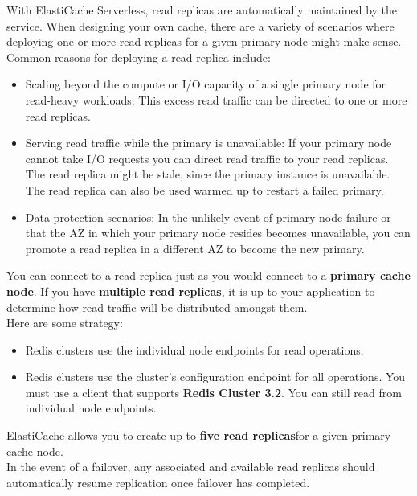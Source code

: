 \documentclass[12pt, letterpaper, twoside]{article}
\begin{document}
With ElastiCache Serverless, read replicas are automatically maintained by the service. When designing your own 
cache, there are a variety of scenarios where deploying one or more read replicas for a given primary node might 
make sense.\\
Common reasons for deploying a read replica include:
\begin{itemize}
	\item Scaling beyond the compute or I/O capacity of a single primary node for read-heavy workloads: This 
		excess read traffic can be directed to one or more read replicas.
	\item Serving read traffic while the primary is unavailable: If your primary node cannot take I/O requests
		you can direct read traffic to your read replicas.\\
		The read replica might be stale, since the primary instance is unavailable. The read replica can also be 
		used warmed up to restart a failed primary.\\
	\item Data protection scenarios: In the unlikely event of primary node failure or that the AZ in which your 
		primary node resides becomes unavailable, you can promote a read replica in a different AZ to become the 
		new primary.
\end{itemize}

You can connect to a read replica just as you would connect to a \textbf{primary cache node}. If you have \textbf{multiple 
read replicas}, it is up to your application to determine how read traffic will be distributed amongst them.\\
Here are some strategy:
\begin{itemize}
	\item Redis clusters use the individual node endpoints for read operations.
	\item Redis clusters use the cluster's configuration endpoint for all operations. You must use a client that supports 
		\textbf{Redis Cluster 3.2}. You can still read from individual node endpoints.
\end{itemize}

ElastiCache allows you to create up to \textbf{five read replicas}for a given primary cache node.\\

In the event of a failover, any associated and available read replicas should automatically resume replication once 
failover has completed.\\
\end{document}
